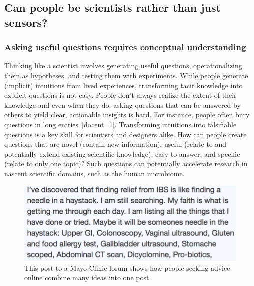 \subsection{Can people be scientists rather than just sensors?}


\subsubsection{Asking useful questions requires conceptual understanding}
Thinking like a scientist involves generating useful questions,
operationalizing them as hypotheses, and testing them
with experiments. While people generate (implicit) intuitions
from lived experiences, transforming tacit knowledge into
explicit questions is not easy. People don’t always realize the
extent of their knowledge and even when they do, asking questions 
that can be answered by others to yield clear, actionable
insights is hard. For instance, people often bury
questions in long entries~\ref{docent_1}. Transforming intuitions
into falsifiable questions is a key skill for scientists and designers
alike. How can people create questions that are novel
(contain new information), useful (relate to and potentially
extend existing scientific knowledge), easy to answer, and
specific (relate to only one topic)? Such questions can
potentially accelerate research in nascent scientific domains,
such as the human microbiome.

\begin{figure}[h] 
  \centering
  \includegraphics[width=1.0\textwidth]{figures/docent/fig-1.png}
  \caption[]
{This post to a Mayo Clinic forum shows how people
seeking advice online combine many ideas into one post..}
  \label{fig:docent-1}
\end{figure}


